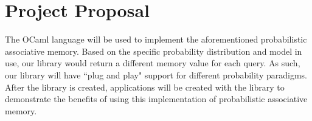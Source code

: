 \documentclass{sig-alternate}
\begin{document}





\section{Project Proposal}
\label{sec:project_proposal}
The OCaml language will be used to implement the aforementioned probabilistic 
associative memory. Based on the specific probability distribution and model in use, our library would return 
a different memory value for each query. As such, our library will have ``plug and play" support for 
different probability paradigms. After the library is created, applications will be created with the library to demonstrate the benefits of using this implementation
of probabilistic associative memory.
\end{document}
